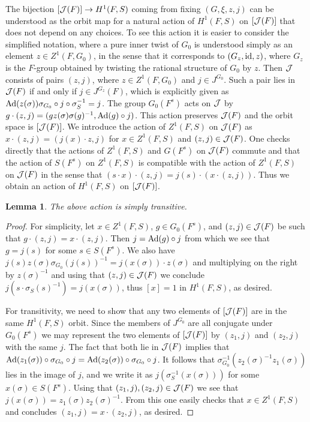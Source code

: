 \documentclass{article}
\newtheorem{lem}[thm]{Lemma}
\theoremstyle{definition}
\numberwithin{equation}{section}
\renewcommand{\-}{\hyp{}}
\begin{document}
The bijection $[\mathcal{J}(F)] \to H^1(F,S)$ coming from fixing $(G,\xi,z,j)$ can be understood as the orbit map for a natural action of $H^1(F,S)$ on $[\mathcal{J}(F)]$ that does not depend on any choices. To see this action it is easier to consider the simplified notation, where a pure inner twist of $G_0$ is understood simply as an element $z \in Z^1(F,G_0)$, in the sense that it corresponds to $(G_z,\textrm{id},z)$, where $G_z$ is the $F$-group obtained by twisting the rational structure of $G_0$ by $z$. Then $\mathcal{J}$ consists of pairs $(z,j)$, where $z \in Z^1(F,G_0)$ and $j \in J^{G_0}$. Such a pair lies in $\mathcal{J}(F)$ if and only if $j \in J^{G_z}(F)$, which is explicitly given as $\textrm{Ad}(z(\sigma))\sigma_{G_0} \circ j \circ \sigma_S^{-1}=j$. The group $G_0(F^s)$ acts on $\mathcal{J}$ by $g \cdot (z,j) = (gz(\sigma)\sigma(g)^{-1},\textrm{Ad}(g)\circ j)$. This action preserves $\mathcal{J}(F)$ and the orbit space is $[\mathcal{J}(F)]$. We introduce the action of $Z^1(F,S)$ on $\mathcal{J}(F)$ as $x \cdot (z,j) = (j(x) \cdot z,j)$ for $x \in Z^1(F,S)$ and $(z,j) \in \mathcal{J}(F)$. One checks directly that the actions of $Z^1(F,S)$ and $G(F^s)$ on $\mathcal{J}(F)$ commute and that the action of $S(F^s)$ on $Z^1(F,S)$ is compatible with the action of $Z^1(F,S)$ on $\mathcal{J}(F)$ in the sense that $(s\cdot x) \cdot (z,j) = j(s) \cdot (x \cdot (z,j))$. Thus we obtain an action of $H^1(F,S)$ on $[\mathcal{J}(F)]$. 
\begin{lem} \label{lem:simtrans}
The above action is simply transitive.
\end{lem}
\begin{proof}
For simplicity, let $x \in Z^1(F,S)$, $g \in G_0(F^s)$, and $(z,j) \in \mathcal{J}(F)$ be such that $g \cdot (z,j)=x\cdot (z,j)$. Then $j=\textrm{Ad}(g)\circ j$ from which we see that $g=j(s)$ for some $s \in S(F^s)$. We also have $j(s)z(\sigma)\sigma_{G_0}(j(s))^{-1}=j(x(\sigma))\cdot z(\sigma)$ and multiplying on the right by $z(\sigma)^{-1}$ and using that $(z,j) \in \mathcal{J}(F)$ we conclude $j(s \cdot \sigma_S(s)^{-1})=j(x(\sigma))$, thus $[x]=1$ in $H^1(F,S)$, as desired.

For transitivity, we need to show that any two elements of $[\mathcal{J}(F)]$ are in the same $H^1(F,S)$ orbit. Since the members of $J^{G_0}$ are all conjugate under $G_0(F^s)$ we may represent the two elements of $[\mathcal{J}(F)]$ by $(z_1,j)$ and $(z_2,j)$ with the same $j$. The fact that both lie in $\mathcal{J}(F)$ implies that $\textrm{Ad}(z_1(\sigma))\circ\sigma_{G_0}\circ j = \textrm{Ad}(z_2(\sigma))\circ\sigma_{G_0}\circ j$. It follows that $\sigma_{G_0}^{-1}(z_2(\sigma)^{-1}z_1(\sigma))$ lies in the image of $j$, and we write it as $j(\sigma_S^{-1}(x(\sigma)))$ for some $x(\sigma) \in S(F^s)$. Using that $(z_1,j),(z_2,j) \in \mathcal{J}(F)$ we see that $j(x(\sigma))=z_1(\sigma)z_2(\sigma)^{-1}$. From this one easily checks that $x \in Z^1(F,S)$ and concludes $(z_1,j)=x\cdot (z_2,j)$, as desired.
\end{proof}
\end{document}
